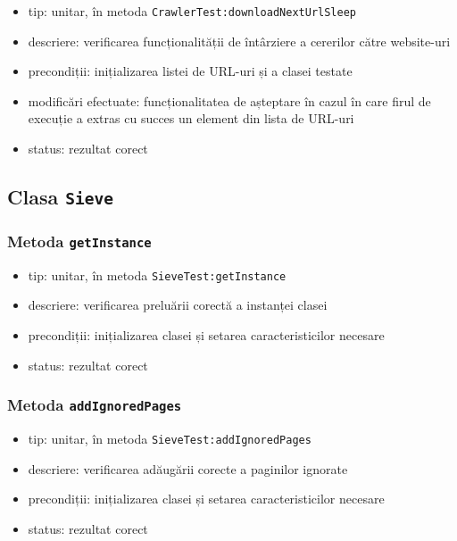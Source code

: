 \documentclass[12pt]{article}
\begin{document}
\begin{itemize}
    \item tip: unitar, în metoda \texttt{CrawlerTest:downloadNextUrlSleep}
    \item descriere: verificarea funcționalității de întârziere a cererilor către website-uri
    \item precondiții: inițializarea listei de URL-uri și a clasei testate
    \item modificări efectuate: funcționalitatea de așteptare în cazul în care firul de execuție a extras cu succes un element din lista de URL-uri
    \item status: rezultat corect
\end{itemize}

\subsection{Clasa \texttt{Sieve}}

\subsubsection{Metoda \texttt{getInstance}}

\begin{itemize}
    \item tip: unitar, în metoda \texttt{SieveTest:getInstance}
    \item descriere: verificarea preluării corectă a instanței clasei
    \item precondiții: inițializarea clasei și setarea caracteristicilor necesare
    \item status: rezultat corect
\end{itemize}

\subsubsection{Metoda \texttt{addIgnoredPages}}

\begin{itemize}
    \item tip: unitar, în metoda \texttt{SieveTest:addIgnoredPages}
    \item descriere: verificarea adăugării corecte a paginilor ignorate
    \item precondiții: inițializarea clasei și setarea caracteristicilor necesare
    \item status: rezultat corect
\end{itemize}
\end{document}
